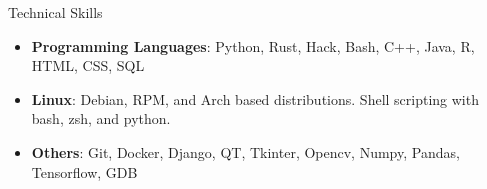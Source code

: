 \documentclass[]{mcdowellcv}
\begin{document}
\begin{cvsection}{Technical Skills}
    \begin{cvsubsection}{}{}{}
        \begin{itemize}
            \item \textbf{Programming Languages}:  Python, Rust, Hack, Bash, C++, Java, R, HTML, CSS, SQL
            \item \textbf{Linux}: Debian, RPM, and Arch based distributions. Shell scripting with bash, zsh, and python. 
            \item \textbf{Others}:  Git, Docker, Django, QT, Tkinter, Opencv, Numpy, Pandas, Tensorflow, GDB
        \end{itemize}
    \end{cvsubsection}
\end{cvsection}
\end{document}
